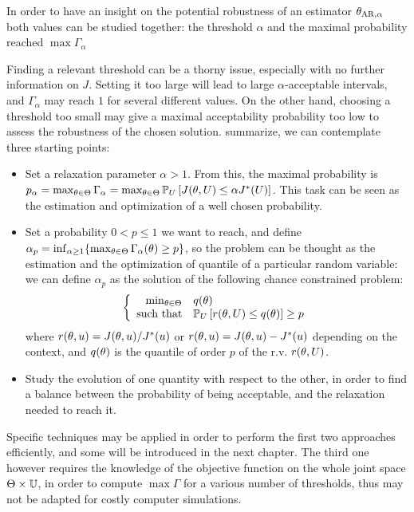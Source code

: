 \documentclass[../../Main_ManuscritThese.tex]{subfiles}
\begin{document}
  In order to have an insight on the potential robustness of an estimator ${\theta}_{\mathrm{AR,\alpha}}$ both values can be studied together: the threshold $\alpha$ and the maximal probability reached $\max \Gamma_\alpha$

  
  Finding a relevant threshold can be a thorny issue, especially with no further information on $J$. Setting it too large will lead to large $\alpha$-acceptable intervals, and $\Gamma_\alpha$  may reach $1$ for several different values. On the other hand, choosing a threshold too small may give a maximal acceptability probability too low to assess the robustness of the chosen solution.
 summarize, we can contemplate three starting points:
 \begin{itemize}
\item Set a relaxation parameter $\alpha > 1$. From this, the maximal probability is $p_{\alpha} = \max_{\theta\in\Theta} \Gamma_{\alpha} = \max_{\theta\in\Theta} \mathbb{P}_{U}\left[J(\theta, U) \leq \alpha J^*(U)\right]$. This task can be seen as the estimation and optimization of a well chosen probability.

   
\item Set a probability $0< p\leq 1 $ we want to reach, and define $\alpha_p = \inf_{\alpha \geq 1}\{\max_{\theta \in \Theta}\Gamma_{\alpha}(\theta)\geq p \}$, so the problem can be thought as the estimation and the optimization of quantile of a particular random variable: we can define $\alpha_p$ as the solution of the following chance constrained problem:
  \begin{equation}
    \label{eq:opt_alpha_p_formulation}
  \left\{
  \begin{array}{rl}
    \min_{\theta\in\Theta} &  q(\theta) \\
  \text{such that} & \mathbb{P}_{U}\left[r(\theta, U) \leq q(\theta) \right] \geq p
  \end{array}
  \right.
\end{equation}
where $r(\theta, u) = J(\theta, u)/J^*(u)$ or $r(\theta, u)=J(\theta, u) - J^*(u)$ depending on the context, and $q(\theta)$ is the quantile of order $p$ of the r.v. $r(\theta, U)$.



\item Study the evolution of one quantity with respect to the other, in order to find a balance between the probability of being acceptable, and the relaxation needed to reach it.
\end{itemize}

Specific techniques may be applied in order to perform the first two approaches efficiently, and some will be introduced in the next chapter. The third one however requires the knowledge of the objective function on the whole joint space $\Theta \times \mathbb{U}$, in order to compute $\max \Gamma$ for a various number of thresholds, thus may not be adapted for costly computer simulations.
\end{document}
